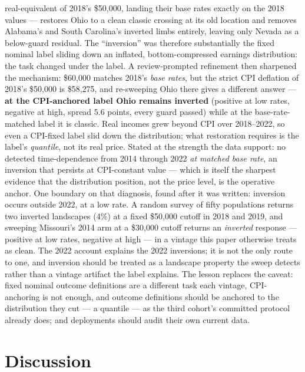 \documentclass[conference]{IEEEtran}
\begin{document}
real-equivalent of 2018's \$50{,}000, landing their base rates exactly on the 2018 values
--- restores Ohio to a clean classic crossing at its old location and removes Alabama's
and South Carolina's inverted limbs entirely, leaving only Nevada as a below-guard
residual. The ``inversion'' was therefore substantially the fixed nominal label sliding
down an inflated, bottom-compressed earnings distribution: the task changed under the
label. A review-prompted refinement then sharpened the mechanism: \$60{,}000 matches
2018's \emph{base rates}, but the strict CPI deflation of 2018's \$50{,}000 is
\$58{,}275, and re-sweeping Ohio there gives a different answer --- \textbf{at the
CPI-anchored label Ohio remains inverted} (positive at low rates, negative at high,
spread 5.6 points, every guard passed) while at the base-rate-matched label it is
classic. Real incomes grew beyond CPI over 2018--2022, so even a CPI-fixed label slid
down the distribution; what restoration requires is the label's \emph{quantile}, not
its real price. Stated at the strength the data support: no detected time-dependence
from 2014 through 2022 \emph{at matched base rate}, an inversion that persists at
CPI-constant value --- which is itself the sharpest evidence that the distribution
position, not the price level, is the operative anchor. One boundary on that diagnosis, found after it was written: inversion occurs outside 2022,
at a low rate. A random survey of fifty populations returns two inverted landscapes (4\%) at
a fixed \$50{,}000 cutoff in 2018 and 2019, and sweeping Missouri's 2014 arm at
a \$30{,}000 cutoff returns an \emph{inverted} response --- positive at low rates, negative
at high --- in a vintage this paper otherwise treats as clean. The 2022 account explains the
2022 inversions; it is not the only route to one, and inversion should be treated as a
landscape property the sweep detects rather than a vintage artifact the label explains.
The lesson replaces the caveat:
fixed nominal outcome definitions are a different task each vintage, CPI-anchoring is
not enough, and outcome definitions should be anchored to the distribution they cut ---
a quantile --- as the third cohort's committed protocol already does; and deployments
should audit their own current data.

\section{Discussion}
\label{sec:discussion}
\end{document}
